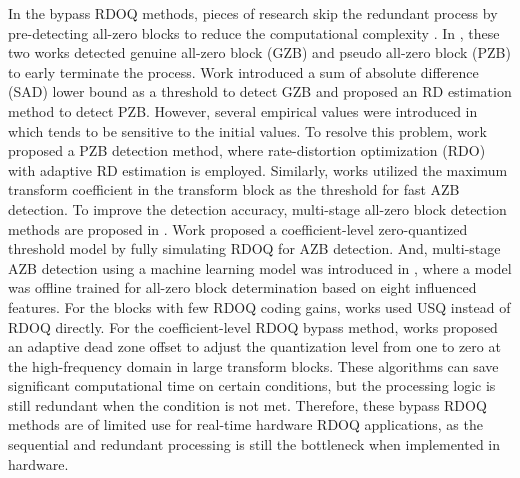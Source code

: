 \documentclass[lettersize,journal]{IEEEtran}
\begin{document}
In the bypass RDOQ methods, pieces of research skip the redundant process by pre-detecting all-zero blocks to reduce the computational complexity \cite{lee2016all-zero, wang2017fastrdoq}. In \cite{fan2016hybridzreoblock, cui2018hybrid}, these two works detected genuine all-zero block (GZB) and pseudo all-zero block (PZB) to early terminate the process. Work \cite{fan2016hybridzreoblock} introduced a sum of absolute difference (SAD) lower bound as a threshold to detect GZB and proposed an RD estimation method to detect PZB. However, several empirical values were introduced in \cite{fan2016hybridzreoblock} which tends to be sensitive to the initial values. To resolve this problem, work \cite{cui2018hybrid} proposed a PZB detection method, where rate-distortion optimization (RDO) with adaptive RD estimation is employed. Similarly, works \cite{cui2017adaptive, wei2019all} utilized the maximum transform coefficient in the transform block as the threshold for fast AZB detection. To improve the detection accuracy, multi-stage all-zero block detection methods are proposed in \cite{yin2018efficient, yin2020multistageallzerodetection}. Work \cite{yin2018efficient} proposed a coefficient-level zero-quantized threshold model by fully simulating RDOQ for AZB detection. And, multi-stage AZB detection using a machine learning model was introduced in \cite{yin2020multistageallzerodetection}, where a model was offline trained for all-zero block determination based on eight influenced features. For the blocks with few RDOQ coding gains, works \cite{lee2015fastquantizationmethod, zhang2015fastrdoq} used USQ instead of RDOQ directly. For the coefficient-level RDOQ bypass method, works \cite{xu2018simplifiedrdoq, xu2020simplifiedLevelEstimation} proposed an adaptive dead zone offset to adjust the quantization level from one to zero at the high-frequency domain in large transform blocks. These algorithms can save significant computational time on certain conditions, but the processing logic is still redundant when the condition is not met. Therefore, these bypass RDOQ methods are of limited use for real-time hardware RDOQ applications, as the sequential and redundant processing is still the bottleneck when implemented in hardware. 
\end{document}
